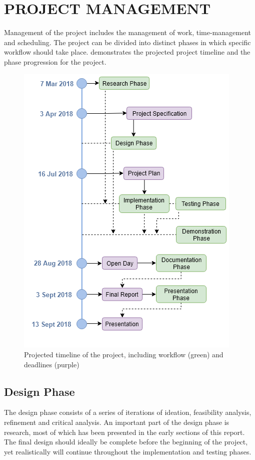\documentclass[10pt,twocolumn]{witseiepaper}
\begin{document}
\section{PROJECT MANAGEMENT}

	Management of the project includes the management of work, time-management and scheduling. The project can be divided into distinct phases in which specific workflow should take place.  demonstrates the projected project timeline and the phase progression for the project.
	
	\begin{figure}
		\centering
		\includegraphics[width=1\columnwidth]{media/timeline.png}
		\caption{Projected timeline of the project, including workflow (green) and deadlines (purple)}
		\raggedright
		\label{fig:timeline}
	\end{figure}
	
	\subsection{Design Phase}
		The design phase consists of a series of iterations of ideation, feasibility analysis, refinement and critical analysis. An important part of the design phase is research, most of which has been presented in the early sections of this report. The final design should ideally be complete before the beginning of the project, yet realistically will continue throughout the implementation and testing phases. 
		
\end{document}
